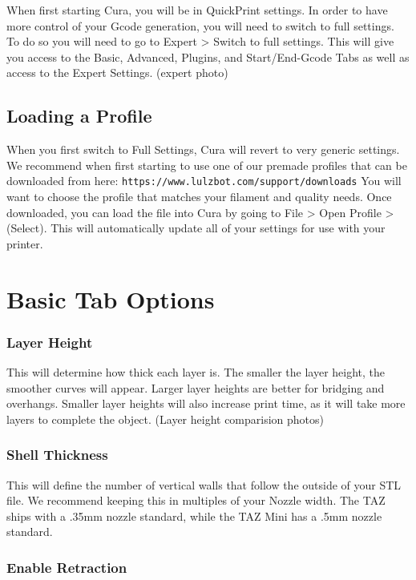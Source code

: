 When first starting Cura, you will be in QuickPrint settings. In order to have more control of your Gcode generation, you will need to switch to full settings. To do so you will need to go to Expert > Switch to full settings. This will give you access to the Basic, Advanced, Plugins, and Start/End-Gcode Tabs as well as access to the Expert Settings. (expert photo)

\subsection{Loading a Profile}

When you first switch to Full Settings, Cura will revert to very generic settings. We recommend when first starting to use one of our premade profiles that can be downloaded from here: \texttt{https://www.lulzbot.com/support/downloads} You will want to choose the profile that matches your filament and quality needs. Once downloaded, you can load the file into Cura by going to File > Open Profile > (Select). This will automatically update all of your settings for use with your printer.

\section{Basic Tab Options}

\subsubsection{Layer Height}

This will determine how thick each layer is. The smaller the layer height, the smoother curves will appear. Larger layer heights are better for bridging and overhangs. Smaller layer heights will also increase print time, as it will take more layers to complete the object. (Layer height comparision photos)

\subsubsection{Shell Thickness}

This will define the number of vertical walls that follow the outside of your STL file. We recommend keeping this in multiples of your Nozzle width. The TAZ ships with a .35mm nozzle standard, while the TAZ Mini has a .5mm nozzle standard.

\subsubsection{Enable Retraction}

